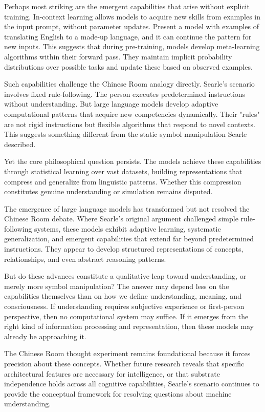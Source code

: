 Perhaps most striking are the emergent capabilities that arise without explicit training. In-context learning allows models to acquire new skills from examples in the input prompt, without parameter updates. Present a model with examples of translating English to a made-up language, and it can continue the pattern for new inputs. This suggests that during pre-training, models develop meta-learning algorithms within their forward pass. They maintain implicit probability distributions over possible tasks and update these based on observed examples.

Such capabilities challenge the Chinese Room analogy directly. Searle's scenario involves fixed rule-following. The person executes predetermined instructions without understanding. But large language models develop adaptive computational patterns that acquire new competencies dynamically. Their "rules" are not rigid instructions but flexible algorithms that respond to novel contexts. This suggests something different from the static symbol manipulation Searle described.

Yet the core philosophical question persists. The models achieve these capabilities through statistical learning over vast datasets, building representations that compress and generalize from linguistic patterns. Whether this compression constitutes genuine understanding or simulation remains disputed.

The emergence of large language models has transformed but not resolved the Chinese Room debate. Where Searle's original argument challenged simple rule-following systems, these models exhibit adaptive learning, systematic generalization, and emergent capabilities that extend far beyond predetermined instructions. They appear to develop structured representations of concepts, relationships, and even abstract reasoning patterns.

But do these advances constitute a qualitative leap toward understanding, or merely more symbol manipulation? The answer may depend less on the capabilities themselves than on how we define understanding, meaning, and consciousness. If understanding requires subjective experience or first-person perspective, then no computational system may suffice. If it emerges from the right kind of information processing and representation, then these models may already be approaching it.

The Chinese Room thought experiment remains foundational because it forces precision about these concepts. Whether future research reveals that specific architectural features are necessary for intelligence, or that substrate independence holds across all cognitive capabilities, Searle's scenario continues to provide the conceptual framework for resolving questions about machine understanding.

